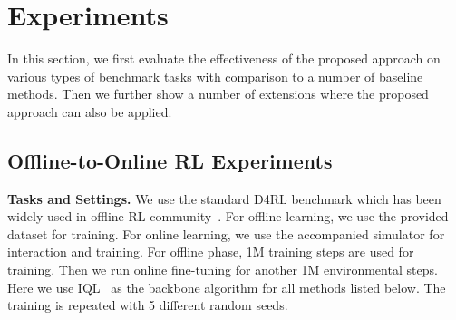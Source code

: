 \documentclass{article}
\begin{document}
\vspace{-0.1in}
\section{Experiments}
\vspace{-0.1in}
In this section, we first evaluate the effectiveness of the proposed approach on various types of benchmark tasks with comparison to a number of baseline methods.
Then we further show a number of extensions where the proposed approach can also be applied.

\vspace{-0.1in}
\subsection{Offline-to-Online RL Experiments} \label{sec:offline_to_online}
\vspace{-0.05in}

\textbf{Tasks and Settings.}
We use the standard D4RL benchmark which has been widely used in offline RL community~\citep{d4rl}.
For offline learning, we use the provided dataset for training. For online learning, we
use the accompanied simulator for interaction and training.
For offline phase,  1M training steps are used for training.
Then we run online fine-tuning for another 1M environmental steps.
Here we use IQL~\citep{iql} as the backbone algorithm for all methods listed below.
The training is repeated with 5 different random seeds.
\end{document}
